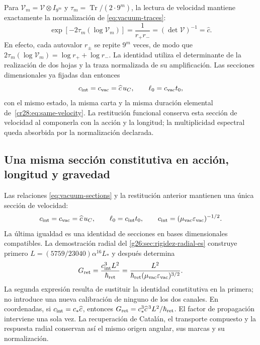 Para $\mathcal V_m=\mathcal V\otimes I_{9^m}$ y
$\tau_m=\operatorname{Tr}/(2\cdot9^m)$, la lectura de velocidad
mantiene exactamente la normalización de
\eqref{eq:vacuum-traces}:
\begin{equation}
 \exp[-2\tau_m(\log\mathcal V_m)]
   =\frac1{r_+r_-}
   =(\det\mathcal V)^{-1}=\widehat c.
 \label{cr28:eq:velocity-normalized}
\end{equation}
En efecto, cada autovalor $r_\pm$ se repite $9^m$ veces, de modo
que $2\tau_m(\log\mathcal V_m)=\log r_++\log r_-$.
La identidad utiliza el determinante de la realización de dos hojas
y la traza normalizada de su amplificación. Las secciones
dimensionales ya fijadas dan entonces
\[
 c_{\rm int}=c_{\rm vac}=\widehat c\,u_C,
 \qquad \ell_0=c_{\rm vac}t_0,
\]
con el mismo estado, la misma carta y la misma duración elemental
de~\eqref{cr28:eq:same-velocity}.
La restitución funcional conserva esta sección de velocidad al
componerla con la acción y la longitud; la multiplicidad espectral
queda absorbida por la normalización declarada.


\subsection{Una misma sección constitutiva en acción, longitud y gravedad}
\label{cr28:sec:constitutive-radial}
Las relaciones \eqref{eq:vacuum-sections} y la restitución anterior
mantienen una única sección de velocidad:
\begin{equation}
 c_{\rm int}=c_{\rm vac}=\widehat c\,u_C,\qquad
 \ell_0=c_{\rm int}t_0,\qquad
 c_{\rm int}=(\mu_{\rm vac}\varepsilon_{\rm vac})^{-1/2}.
 \label{cr28:eq:same-velocity}
\end{equation}
La última igualdad es una identidad de secciones en bases dimensionales
compatibles. La demostración radial del
\cref{g26:sec:rigidez-radial-es} construye primero
\(L=(5759/23040)\alpha^{16}L_*\) y después determina
\begin{equation}
 G_{\rm ret}=\frac{c_{\rm int}^3L^2}{\hbar_{\rm ret}}
 =\frac{L^2}
 {\hbar_{\rm ret}(\mu_{\rm vac}\varepsilon_{\rm vac})^{3/2}}.
 \label{cr28:eq:constitutive-gravity}
\end{equation}
La segunda expresión resulta de sustituir la identidad constitutiva en
la primera; no introduce una nueva calibración de ninguno de los dos
canales. En coordenadas, si \(c_{\rm int}=c_*\widehat c\), entonces
\(G_{\rm ret}=c_*^3\widehat c^{\,3}L^2/\hbar_{\rm ret}\).
El factor de propagación interviene una sola vez. La recuperación de
Catalán, el transporte compuesto y la respuesta radial conservan así
el mismo origen angular, sus marcas y su normalización.

